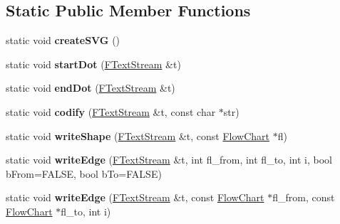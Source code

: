 \subsection*{Static Public Member Functions}
\begin{DoxyCompactItemize}
\item 
\mbox{\label{class_flow_chart_a7848f4e846cafbec9e8a6ecca50d4fb2}} 
static void {\bfseries create\+S\+VG} ()
\item 
\mbox{\label{class_flow_chart_ad4f3d48005f28f67caf94092bba83f09}} 
static void {\bfseries start\+Dot} (\mbox{\hyperlink{class_f_text_stream}{F\+Text\+Stream}} \&t)
\item 
\mbox{\label{class_flow_chart_afe3272c4bd287ec7e0be2d5692c317f0}} 
static void {\bfseries end\+Dot} (\mbox{\hyperlink{class_f_text_stream}{F\+Text\+Stream}} \&t)
\item 
\mbox{\label{class_flow_chart_a0e83ebb53eb764f939e3557a33b7fb7e}} 
static void {\bfseries codify} (\mbox{\hyperlink{class_f_text_stream}{F\+Text\+Stream}} \&t, const char $\ast$str)
\item 
\mbox{\label{class_flow_chart_a66031ab509dca5ffed6e6d47a6c0d87f}} 
static void {\bfseries write\+Shape} (\mbox{\hyperlink{class_f_text_stream}{F\+Text\+Stream}} \&t, const \mbox{\hyperlink{class_flow_chart}{Flow\+Chart}} $\ast$fl)
\item 
\mbox{\label{class_flow_chart_ae431d10864639f0aa1eb8aca5dc3ca5e}} 
static void {\bfseries write\+Edge} (\mbox{\hyperlink{class_f_text_stream}{F\+Text\+Stream}} \&t, int fl\+\_\+from, int fl\+\_\+to, int i, bool b\+From=F\+A\+L\+SE, bool b\+To=F\+A\+L\+SE)
\item 
\mbox{\label{class_flow_chart_a5837532d8952aec2d3648498f409b0ce}} 
static void {\bfseries write\+Edge} (\mbox{\hyperlink{class_f_text_stream}{F\+Text\+Stream}} \&t, const \mbox{\hyperlink{class_flow_chart}{Flow\+Chart}} $\ast$fl\+\_\+from, const \mbox{\hyperlink{class_flow_chart}{Flow\+Chart}} $\ast$fl\+\_\+to, int i)
\item 
\mbox{\label{class_flow_chart_ae4183bb824a2bc2246ee910aeb6a8272}} 

\end{DoxyCompactItemize}
